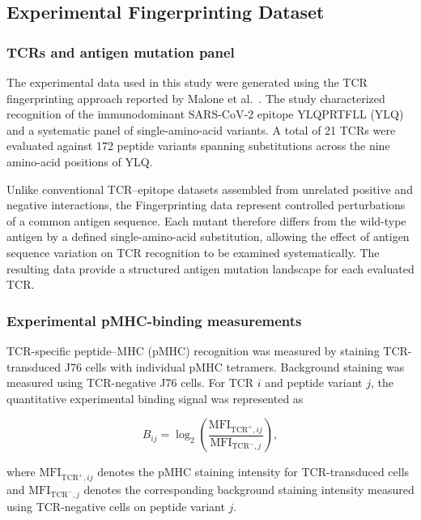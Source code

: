 \subsection{Experimental Fingerprinting Dataset}

\subsubsection{TCRs and antigen mutation panel}
The experimental data used in this study were generated using the TCR fingerprinting approach reported by Malone et al.~\cite{malone2025fingerprinting}. 
The study characterized recognition of the immunodominant SARS-CoV-2 epitope YLQPRTFLL (YLQ) and a systematic panel of single-amino-acid variants. 
A total of 21 TCRs were evaluated against 172 peptide variants spanning substitutions across the nine amino-acid positions of YLQ.

Unlike conventional TCR--epitope datasets assembled from unrelated positive and negative interactions, the Fingerprinting data represent controlled perturbations of a common antigen sequence. Each mutant therefore differs from the wild-type antigen by a defined single-amino-acid substitution, allowing the effect of antigen sequence variation on TCR recognition to be examined systematically. The resulting data provide a structured antigen mutation landscape for each evaluated TCR.



\subsubsection{Experimental pMHC-binding measurements}
TCR-specific peptide--MHC (pMHC) recognition was measured by staining TCR-transduced J76 cells with individual pMHC tetramers. Background staining 
was measured using TCR-negative J76 cells. For TCR $i$ and peptide variant $j$, the quantitative experimental binding signal was represented as

\begin{equation}
B_{ij}=
\log_2
\left(
\frac{\mathrm{MFI}_{\mathrm{TCR}^{+},ij}}
     {\mathrm{MFI}_{\mathrm{TCR}^{-},j}}
\right),
\label{eq:binding_signal}
\end{equation}

where $\mathrm{MFI}_{\mathrm{TCR}^{+},ij}$ denotes the pMHC staining 
intensity for TCR-transduced cells and $\mathrm{MFI}_{\mathrm{TCR}^{-},j}$ 
denotes the corresponding background staining intensity measured using TCR-negative cells on peptide variant $j$.


